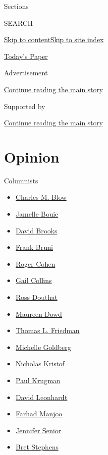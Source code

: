 Sections

SEARCH

\protect\hyperlink{site-content}{Skip to
content}\protect\hyperlink{site-index}{Skip to site index}

\href{https://myaccount.nytimes3xbfgragh.onion/auth/login?response_type=cookie\&client_id=vi}{}

\href{https://www.nytimes3xbfgragh.onion/section/todayspaper}{Today's
Paper}

Advertisement

\protect\hyperlink{after-top}{Continue reading the main story}

Supported by

\protect\hyperlink{after-sponsor}{Continue reading the main story}

\hypertarget{opinion}{%
\section{Opinion}\label{opinion}}

Columnists

\begin{itemize}
\tightlist
\item
  \href{/column/charles-m-blow}{Charles M. Blow}
\item
  \href{/column/jamelle-bouie}{Jamelle Bouie}
\item
  \href{/column/david-brooks}{David Brooks}
\item
  \href{/column/frank-bruni}{Frank Bruni}
\item
  \href{/column/roger-cohen}{Roger Cohen}
\item
  \href{/column/gail-collins}{Gail Collins}
\item
  \href{/column/ross-douthat}{Ross Douthat}
\item
  \href{/column/maureen-dowd}{Maureen Dowd}
\item
  \href{/column/thomas-l-friedman}{Thomas L. Friedman}
\item
  \href{/column/michelle-goldberg}{Michelle Goldberg}
\item
  \href{/column/nicholas-kristof}{Nicholas Kristof}
\item
  \href{/column/paul-krugman}{Paul Krugman}
\item
  \href{/column/david-leonhardt}{David Leonhardt}
\item
  \href{/column/farhad-manjoo}{Farhad Manjoo}
\item
  \href{/column/jennifer-senior}{Jennifer Senior}
\item
  \href{/column/bret-stephens}{Bret Stephens}
\end{itemize}

